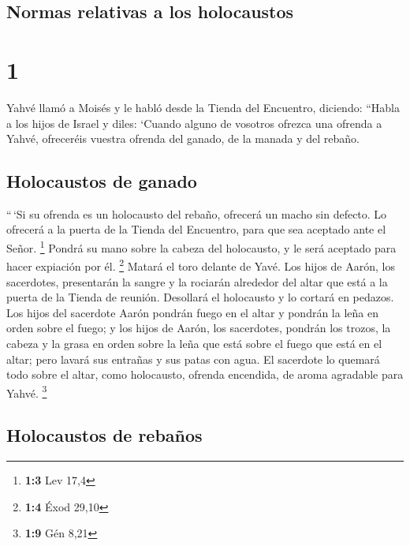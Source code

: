\hypertarget{normas-relativas-a-los-holocaustos}{%
\subsection{Normas relativas a los
holocaustos}\label{normas-relativas-a-los-holocaustos}}

\hypertarget{section}{%
\section{1}\label{section}}

 Yahvé llamó a Moisés y le habló desde la Tienda del
Encuentro, diciendo:  ``Habla a los hijos de Israel y
diles: `Cuando alguno de vosotros ofrezca una ofrenda a Yahvé,
ofreceréis vuestra ofrenda del ganado, de la manada y del rebaño.

\hypertarget{holocaustos-de-ganado}{%
\subsection{Holocaustos de ganado}\label{holocaustos-de-ganado}}

 ``\,`Si su ofrenda es un holocausto del rebaño, ofrecerá
un macho sin defecto. Lo ofrecerá a la puerta de la Tienda del
Encuentro, para que sea aceptado ante el Señor. \footnote{\textbf{1:3}
  Lev 17,4}  Pondrá su mano sobre la cabeza del
holocausto, y le será aceptado para hacer expiación por él. \footnote{\textbf{1:4}
  Éxod 29,10}  Matará el toro delante de Yavé. Los hijos
de Aarón, los sacerdotes, presentarán la sangre y la rociarán alrededor
del altar que está a la puerta de la Tienda de reunión. 
Desollará el holocausto y lo cortará en pedazos.  Los
hijos del sacerdote Aarón pondrán fuego en el altar y pondrán la leña en
orden sobre el fuego;  y los hijos de Aarón, los
sacerdotes, pondrán los trozos, la cabeza y la grasa en orden sobre la
leña que está sobre el fuego que está en el altar;  pero
lavará sus entrañas y sus patas con agua. El sacerdote lo quemará todo
sobre el altar, como holocausto, ofrenda encendida, de aroma agradable
para Yahvé. \footnote{\textbf{1:9} Gén 8,21}

\hypertarget{holocaustos-de-rebauxf1os}{%
\subsection{Holocaustos de rebaños}\label{holocaustos-de-rebauxf1os}}

